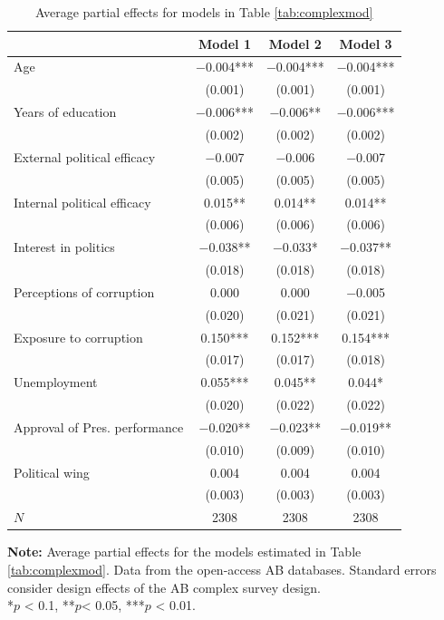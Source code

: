 \documentclass[12pt,a4]{article}\usepackage[]{graphicx}\usepackage[]{xcolor}
\begin{document}
\begin{table}[htbp]
\begin{center}
\caption{Average partial effects for models in Table \ref{tab:complexmod}}
\label{tab:apescomp}

\begin{tabular}[t]{lccc}
\toprule
  & Model 1 & Model 2 & Model 3\\
\midrule
Age & \num{-0.004}*** & \num{-0.004}*** & \num{-0.004}***\\
 & (\num{0.001}) & (\num{0.001}) & (\num{0.001})\\
Years of education & \num{-0.006}*** & \num{-0.006}** & \num{-0.006}***\\
 & (\num{0.002}) & (\num{0.002}) & (\num{0.002})\\
External political efficacy & \num{-0.007} & \num{-0.006} & \num{-0.007}\\
 & (\num{0.005}) & (\num{0.005}) & (\num{0.005})\\
Internal political efficacy & \num{0.015}** & \num{0.014}** & \num{0.014}**\\
 & (\num{0.006}) & (\num{0.006}) & (\num{0.006})\\
Interest in politics & \num{-0.038}** & \num{-0.033}* & \num{-0.037}**\\
 & (\num{0.018}) & (\num{0.018}) & (\num{0.018})\\
Perceptions of corruption & \num{0.000} & \num{0.000} & \num{-0.005}\\
 & (\num{0.020}) & (\num{0.021}) & (\num{0.021})\\
Exposure to corruption & \num{0.150}*** & \num{0.152}*** & \num{0.154}***\\
 & (\num{0.017}) & (\num{0.017}) & (\num{0.018})\\
Unemployment & \num{0.055}*** & \num{0.045}** & \num{0.044}*\\
 & (\num{0.020}) & (\num{0.022}) & (\num{0.022})\\
Approval of Pres. performance & \num{-0.020}** & \num{-0.023}** & \num{-0.019}**\\
 & (\num{0.010}) & (\num{0.009}) & (\num{0.010})\\
Political wing & \num{0.004} & \num{0.004} & \num{0.004}\\
 & (\num{0.003}) & (\num{0.003}) & (\num{0.003})\\
\midrule
$N$ & \num{2308} & \num{2308} & \num{2308}\\
\bottomrule
\end{tabular}


\end{center}
\textbf{Note:} Average partial effects for the models estimated in Table \ref{tab:complexmod}. Data from the open-access AB databases. Standard errors consider design effects of the AB complex survey design.\\
*$p$ < 0.1, **$p$< 0.05, ***$p$ < 0.01.
\end{table}
\end{document}
